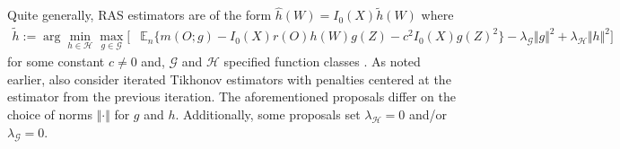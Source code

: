 \documentclass[twoside,11pt]{article}
\newcommand{\E}{\mathbb{E}}
\newcommand{\mc}{\mathcal}
\begin{document}
Quite generally, RAS estimators are of the form $\hat h(W) =I_0(X)\tilde h(W)$ where
\begin{align}
\tilde h:=\arg\min_{h\in\mc{H}}\max_{g\in\mc{G}}[&\E_n\{m(O;g)-I_0(X)r(O)h(W)g(Z)-c^2 I_0(X)g(Z)^2\}-\lambda_{\mc{G}}\Vert g\Vert^2+\lambda_{\mc{H}}\Vert h\Vert^2]
 \label{def:adversarial}
\end{align}
for some constant $c\ne0$ and, $\mc{G}$ and $\mc{H}$ specified function classes \citep{muandet2020dual,dikkala2020minimax, liao2020provably, kallus2021causal, ghassami2022minimax, bennett2022inference, bennett2023source}. As noted earlier, \cite{bennett2023source} also consider iterated Tikhonov estimators with penalties centered at the estimator from the previous iteration.  
The aforementioned proposals differ on the choice of norms $\Vert\cdot\Vert$ for $g$ and $h$. Additionally, some proposals set $\lambda_{\mc{H}}=0$ and/or $\lambda_{\mc{G}}=0$. 
\end{document}
